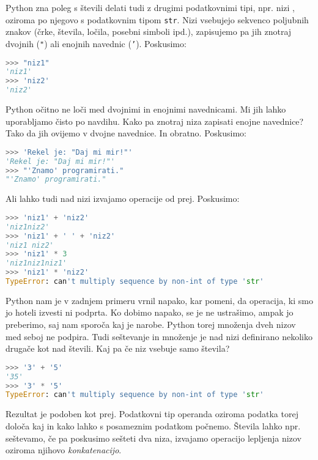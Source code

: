 Python zna poleg s števili delati tudi z drugimi podatkovnimi tipi, npr. nizi , oziroma po njegovo s podatkovnim tipom \texttt{str}. Nizi vsebujejo sekvenco poljubnih znakov (črke, števila, ločila, posebni simboli ipd.), zapisujemo pa jih znotraj dvojnih (\texttt{"}) ali enojnih navednic (\texttt{'}). Poskusimo:
\begin{lstlisting}[language=Python, showstringspaces=false]
>>> "niz1"
'niz1'
>>> 'niz2'
'niz2'
\end{lstlisting}
Python očitno ne loči med dvojnimi in enojnimi navednicami. Mi jih lahko uporabljamo čisto po navdihu. Kako pa znotraj niza zapisati enojne navednice? Tako da jih ovijemo v dvojne navednice. In obratno. Poskusimo:
\begin{lstlisting}[language=Python, showstringspaces=false]
>>> 'Rekel je: "Daj mi mir!"'
'Rekel je: "Daj mi mir!"'
>>> "'Znamo' programirati."
"'Znamo' programirati."
\end{lstlisting}
Ali lahko tudi nad nizi izvajamo operacije od prej. Poskusimo:
\begin{lstlisting}[language=Python, showstringspaces=false]
>>> 'niz1' + 'niz2'
'niz1niz2'
>>> 'niz1' + ' ' + 'niz2'
'niz1 niz2'
>>> 'niz1' * 3
'niz1niz1niz1'
>>> 'niz1' * 'niz2'
TypeError: can't multiply sequence by non-int of type 'str'
\end{lstlisting}
Python nam je v zadnjem primeru vrnil napako, kar pomeni, da operacija, ki smo jo hoteli izvesti ni podprta. Ko dobimo napako, se je ne ustrašimo, ampak jo preberimo, saj nam sporoča kaj je narobe. Python torej množenja dveh nizov med seboj ne podpira.
Tudi seštevanje in množenje je nad nizi definirano nekoliko drugače kot nad števili. Kaj pa če niz vsebuje samo števila?
\begin{lstlisting}[language=Python, showstringspaces=false]
>>> '3' + '5'
'35'
>>> '3' * '5'
TypeError: can't multiply sequence by non-int of type 'str'
\end{lstlisting}
Rezultat je podoben kot prej. Podatkovni tip operanda oziroma podatka torej določa kaj in kako lahko s posameznim podatkom počnemo. Števila lahko npr. seštevamo, če pa poskusimo sešteti dva niza, izvajamo operacijo lepljenja nizov oziroma njihovo \emph{konkatenacijo}. 

